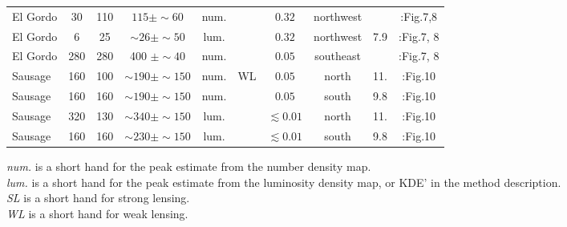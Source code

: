 \begin{table*}
\begin{tabular}{@{}lccccccccc@{}}
		El Gordo & 30 & 110 & $ 115 \pm \sim60$ & num. & & $0.32$ & 
		northwest&   &\citealt{Jee2014}:Fig.7,8  \\
		El Gordo & 6 & 25& $\sim26 \pm \sim50$ & lum. & & $0.32$ & northwest & 7.9   
		&\citealt{Jee2014}:Fig.7, 8  \\
		El Gordo & 280 & 280 & 400 $\pm \sim40$ & num. & & $0.05$ &
		southeast &   &\citealt{Jee2014}:Fig.7, 8  \\
		Sausage &160 & 100& $\sim190\pm \sim150$ & num. & WL & $
		0.05$ & north & 11.  &\citealt{Jee2015}:Fig.10\\ 
		Sausage &160 & 160& $ \sim190\pm \sim150 $  & num. &  & $
		0.05$ & south & 9.8 & \citealt{Jee2015}:Fig.10\\ 

		Sausage & 320 & 130 & $\sim340 \pm \sim150 $  & lum. & & $\lesssim
		0.01$ & north & 11. & \citealt{Jee2015}:Fig.10\\ 

		Sausage & 160 & 160 &$\sim230 \pm \sim150 $  & lum. & & $\lesssim
		0.01$ & south & 9.8 &\citealt{Jee2015}:Fig.10\\ 
	 \hline
	 \end{tabular} 
	 \raggedright{
		 {\it num.} is a short hand for the peak estimate from the number
		 density map. \\
		 {\it lum.} is a short hand for the peak estimate from the luminosity
		 density map, or KDE' in the method description. \\
		 {\it SL} is a short hand for strong lensing. \\
		 {\it WL} is a short hand for weak lensing. \\
	 }

\end{table*}





